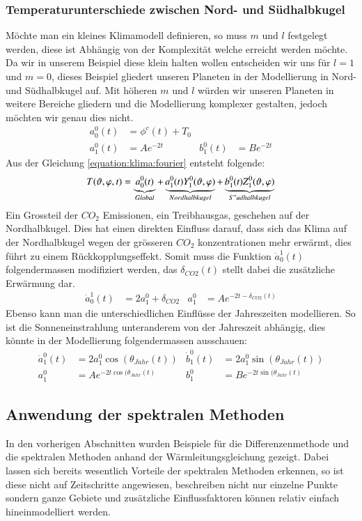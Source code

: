 \begin{refsection}
\subsubsection{Temperaturunterschiede zwischen Nord- und Südhalbkugel
\label{subsubsection:klima:halbkugel}}
Möchte man ein kleines Klimamodell definieren, so muss  $m$ und $l$ festgelegt werden, diese ist Abhängig von der Komplexität welche erreicht werden möchte. Da wir in unserem Beispiel diese klein halten wollen entscheiden wir uns für $l=1$ und $m=0$, dieses Beispiel gliedert unseren Planeten in der Modellierung in Nord- und Südhalbkugel auf. Mit höheren $m$ und $l$ würden wir unseren Planeten in weitere Bereiche gliedern und die Modellierung komplexer gestalten, jedoch möchten wir genau dies nicht.
\begin{align*}
a^0_0(t)&=\phi^c(t)+T_0
\\
a^0_1(t) &=Ae^{-2t}&
b^0_1(t) &=Be^{-2t}
\end{align*}
Aus der Gleichung \eqref{equation:klima:fourier} entsteht folgende:
\begin{align}
T(\vartheta ,\varphi ,t)
=
\underbrace{a^0_0(t)}_{Global} + \underbrace{a^0_1(t)Y^0_1(\vartheta ,\varphi)}_{Nordhalbkugel}+\underbrace{b^0_1(t)Z^0_1(\vartheta ,\varphi)}_{S"udhalbkugel} 
\end{align}
Ein Grossteil der $CO_2$ Emissionen, ein Treibhausgas, geschehen auf der Nordhalbkugel. Dies hat einen direkten Einfluss darauf, dass sich das Klima auf der Nordhalbkugel wegen der grösseren $CO_2$ konzentrationen mehr erwärmt, dies führt zu einem Rückkopplungseffekt. Somit muss die Funktion $\dot a_0^1(t)$ folgendermassen modifiziert werden, das $\delta_{CO2}(t)$ stellt dabei die zusätzliche Erwärmung dar.
\begin{align*}
\dot a_0^1(t) &= 2a_1^0+\delta_{CO2} &
a_1^0 &= Ae^{-2t-\delta_{CO2}(t)}
\end{align*}
Ebenso kann man die unterschiedlichen Einflüsse der Jahreszeiten modellieren. So ist die Sonneneinstrahlung unteranderem von der Jahreszeit abhängig, dies könnte in der Modellierung folgendermassen ausschauen:
\begin{align*}
\dot a_1^0(t) &= 2a_1^0 \cos(\theta_{Jahr}(t)) &
\dot b_1^0(t) &= 2a_1^0 \sin(\theta_{Jahr}(t))
\\
a_1^0 &= Ae^{-2t \cos(\theta_{Jahr}(t)} &
b_1^0 &= Be^{-2t \sin(\theta_{Jahr}(t)}
\end{align*}


\subsection{Anwendung der spektralen Methoden}
In den vorherigen Abschnitten wurden Beispiele für die Differenzenmethode und die spektralen Methoden anhand der Wärmleitungsgleichung gezeigt. Dabei lassen sich bereits wesentlich Vorteile der spektralen Methoden erkennen, so ist diese nicht auf Zeitschritte angewiesen, beschreiben nicht nur einzelne Punkte sondern ganze Gebiete und zusätzliche Einflussfaktoren können relativ einfach hineinmodelliert werden.
 

\end{refsection}
